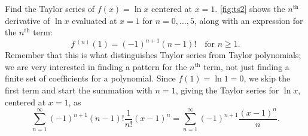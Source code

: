 \begin{example}[The Taylor series of $f(x)=\ln x$ at $x=1$]\label{ex_ts2}%
Find the Taylor series of $f(x) = \ln x$ centered at $x=1$.
\solution
\autoref{fig:ts2} shows the $n^{\text{th}}$ derivative of $\ln x$ evaluated at $x=1$ for $n=0,\dotsc,5$, along with an expression for the $n^{\text{th}}$ term:
\[f\,^{(n)}(1) = (-1)^{n+1}(n-1)!\quad \text{for $n\geq 1$.}\]
Remember that this is what distinguishes Taylor series from Taylor polynomials; we are very interested in finding a pattern for the $n^{\text{th}}$ term, not just finding a finite set of coefficients for a polynomial.
Since $f(1) = \ln 1 = 0$, we skip the first term and start the summation with $n=1$, giving the Taylor series for $\ln x$, centered at $x=1$, as 
\[\sum_{n=1}^\infty (-1)^{n+1}(n-1)!\frac{1}{n!}(x-1)^n = \sum_{n=1}^\infty (-1)^{n+1}\frac{(x-1)^n}{n}.\]
\end{example}

